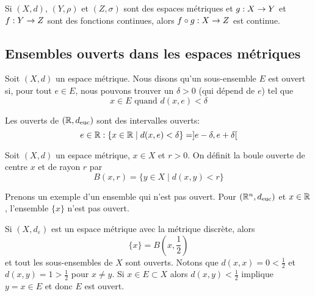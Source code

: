 \documentclass[french]{article}
\begin{document}
\begin{lemme}
  Si $(X, d)$, $(Y, \rho)$ et $(Z, \sigma)$ sont des espaces métriques et $g: X \rightarrow Y$ et $f: Y \rightarrow Z$ sont des fonctions continues, alors $f \circ g: X \rightarrow Z$ est continue.
\end{lemme}

\subsection{Ensembles ouverts dans les espaces métriques}
\begin{definition}
  Soit $(X, d)$ un espace métrique. Nous disons qu'un sous-ensemble $E$ est ouvert si, pour tout $e \in E$, nous pouvons trouver un $\delta > 0$ (qui dépend de $e$) tel que
  $$x \in E \text{ quand } d(x, e) < \delta$$
\end{definition}
Les ouverts de $(\mathbb{R}, d_\text{euc})$ sont des intervalles ouverts:
$$e \in \mathbb{R} : \{ x \in \mathbb{R} \mid d(x, e) < \delta \} = ]e -\delta, e + \delta[$$

\begin{definition}
  Soit $(X, d)$ un espace métrique, $x \in X$ et $r > 0$. On définit la boule ouverte de centre $x$ et de rayon $r$ par
  $$B(x, r) = \{ y \in X \mid d(x, y) < r \}$$
\end{definition}
Prenons un exemple d'un ensemble qui n'est pas ouvert. Pour $(\mathbb{R}^n, d_\text{euc})$ et $x \in \mathbb{R}$, l'ensemble $\{ x \}$ n'est pas ouvert.
\par Si $(X, d_\varepsilon)$ est un espace métrique avec la métrique discrète, alors
$$\{ x \} = B\left(x, \frac{1}{2}\right)$$
et tout les sous-ensembles de $X$ sont ouverts. Notons que $d(x, x) = 0 < \frac{1}{2}$ et $d(x, y) = 1 > \frac{1}{2}$ pour $x \neq y$. Si $x \in E \subset X$ alors $d(x, y) < \frac{1}{2}$ implique $y = x \in E$ et donc $E$ est ouvert.
\end{document}
